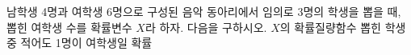남학생 4명과 여학생 6명으로 구성된 음악 동아리에서 임의로 3명의 학생을 뽑을 때, 뽑힌 여학생 수를 확률변수 $X$라 하자. 다음을 구하시오.
 $X$의 확률질량함수
 뽑힌 학생 중 적어도 1명이 여학생일 확률
